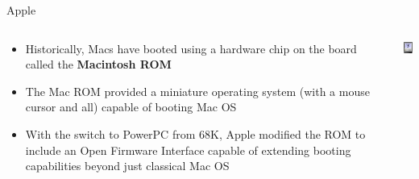 \documentclass{lug}
\begin{document}
\begin{frame}{Apple}
    \begin{columns}
        \begin{column}{0.75\textwidth}
            \begin{itemize}[<+->]
                \item Historically, Macs have booted using a hardware chip on
                    the board called the \textbf{Macintosh ROM}
                \item The Mac ROM provided a miniature operating system (with a
                    mouse cursor and all) capable of booting Mac OS
                \item With the switch to PowerPC from 68K, Apple modified the
                    ROM to include an Open Firmware Interface capable of
                    extending booting capabilities beyond just classical Mac OS
            \end{itemize}
        \end{column}
        \begin{column}{0.25\textwidth}
            \includegraphics[width=\textwidth]{graphics/happymac}
        \end{column}
    \end{columns}
\end{frame}
\end{document}

